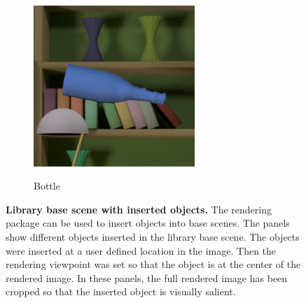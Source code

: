\documentclass{jov}
\begin{document}
\begin{figure}
\begin{subfigure}[b]{0.14 \textwidth}
        \label{fig:libraryWithRingToy}
    \end{subfigure}
        ~
    	\begin{subfigure}[b]{0.14 \textwidth}
        \caption{Bottle}
        \includegraphics[width=\textwidth]{../FiguresDraft4/Figure4/Figure4_e.png}
        \label{fig:libraryWithChampagneBottle}
    \end{subfigure}
\caption{{\bf Library base scene with inserted objects.} The rendering package can be used to insert objects into base scenes. The panels show different objects inserted in the library base scene. The objects were inserted at a user defined location in the image. Then the rendering viewpoint was set so that the object is at the center of the rendered image. In these panels, the full rendered image has been cropped so that the inserted object is visually salient.}\label{fig:libraryWithTarget}
\end{figure}
\end{document}
